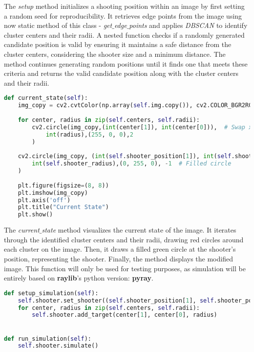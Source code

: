 \documentclass{article}
\begin{document}
	The \textit{setup} method initializes a shooting position within an image by first setting a random seed for reproducibility. It retrieves edge points from the image using now static method of this class - \textit{get$\_$edge$\_$points} and applies \textit{DBSCAN} to identify cluster centers and their radii. A nested function checks if a randomly generated candidate position is valid by ensuring it maintains a safe distance from the cluster centers, considering the shooter size and a minimum distance. The method continues generating random positions until it finds one that meets these criteria and returns the valid candidate position along with the cluster centers and their radii.
	
\begin{lstlisting}[language=python]
   def current_state(self):
	img_copy = cv2.cvtColor(np.array(self.img.copy()), cv2.COLOR_BGR2RGB)
	
	for center, radius in zip(self.centers, self.radii):
		cv2.circle(img_copy,(int(center[1]), int(center[0])),  # Swap x and y for OpenCV's coordinate system
			int(radius),(255, 0, 0),2
		)
	
	cv2.circle(img_copy, (int(self.shooter_position[1]), int(self.shooter_position[0])), 
		int(self.shooter_radius),(0, 255, 0), -1  # Filled circle
	)
	
	plt.figure(figsize=(8, 8))
	plt.imshow(img_copy)
	plt.axis('off')
	plt.title("Current State")
	plt.show()
\end{lstlisting}

	The \textit{current$\_$state} method visualizes the current state of the image. It iterates through the identified cluster centers and their radii, drawing red circles around each cluster on the image. Then, it draws a filled green circle at the shooter's position, representing the shooter. Finally, the method displays the modified image. This function will only be used for testing purposes, as simulation will be entirely based on \textbf{raylib}'s python version: \textbf{pyray}.
	
\begin{lstlisting}[language=python]
def setup_simulation(self):
	self.shooter.set_shooter((self.shooter_position[1], self.shooter_position[0]), self.shooter_radius)
	for center, radius in zip(self.centers, self.radii):
		self.shooter.add_target(center[1], center[0], radius)


def run_simulation(self):
	self.shooter.simulate()
\end{lstlisting}
	
\end{document}

